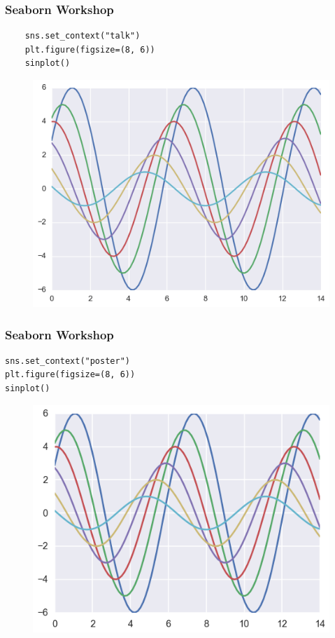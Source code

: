 \documentclass{beamer}
\begin{document}
\begin{frame}[fragile]
	\frametitle{Seaborn Workshop}
	\large
\begin{verbatim}
	sns.set_context("talk")
	plt.figure(figsize=(8, 6))
	sinplot()
\end{verbatim}

\begin{figure}
	\centering
	\includegraphics[width=0.7\linewidth]{images/aesthetics_36_0}
\end{figure}
\end{frame}
\begin{frame}[fragile]
	\frametitle{Seaborn Workshop}
	\large
\begin{verbatim}
sns.set_context("poster")
plt.figure(figsize=(8, 6))
sinplot()
\end{verbatim}

\begin{figure}
	\centering
	\includegraphics[width=0.7\linewidth]{images/aesthetics_37_0}
\end{figure}

\end{frame}
\end{document}
